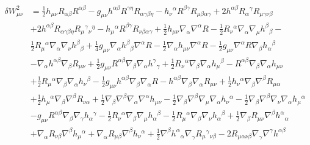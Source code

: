 \documentclass[10pt,letterpaper]{article}
\begin{document}
\begin{align*}
\delta W^2_{\mu\nu} &= \tfrac{1}{2} h_{\mu \nu} R_{\alpha \beta} R^{\alpha \beta} -  g_{\mu \nu} h^{\alpha \beta} R^{\gamma \eta} R_{\alpha \gamma \beta \eta} -  h_{\nu}{}^{\alpha} R^{\beta \gamma} R_{\mu \beta \alpha \gamma} + 2 h^{\alpha \beta} R_{\alpha}{}^{\gamma} R_{\mu \gamma \nu \beta} \\
&+ 2 h^{\alpha \beta} R_{\alpha \gamma \beta \eta} R_{\mu}{}^{\gamma}{}_{\nu}{}^{\eta} -  h_{\mu}{}^{\alpha} R^{\beta \gamma} R_{\nu \beta \alpha \gamma} + \tfrac{1}{2} h_{\mu \nu} \nabla_{\alpha}\nabla^{\alpha}R -  \tfrac{1}{2} R_{\nu}{}^{\alpha} \nabla_{\alpha}\nabla_{\mu}h^{\beta}{}_{\beta} -  \\
&\tfrac{1}{2} R_{\mu}{}^{\alpha} \nabla_{\alpha}\nabla_{\nu}h^{\beta}{}_{\beta} + \tfrac{1}{4} g_{\mu \nu} \nabla_{\alpha}h^{\beta}{}_{\beta} \nabla^{\alpha}R -  \tfrac{1}{2} \nabla_{\alpha}h_{\mu \nu} \nabla^{\alpha}R -  \tfrac{1}{2} g_{\mu \nu} \nabla^{\alpha}R \nabla_{\beta}h_{\alpha}{}^{\beta} \\
&-  \nabla_{\alpha}h^{\alpha \beta} \nabla_{\beta}R_{\mu \nu} + \tfrac{1}{2} g_{\mu \nu} R^{\alpha \beta} \nabla_{\beta}\nabla_{\alpha}h^{\gamma}{}_{\gamma} + \tfrac{1}{2} R_{\nu}{}^{\alpha} \nabla_{\beta}\nabla_{\alpha}h_{\mu}{}^{\beta} -  R^{\alpha \beta} \nabla_{\beta}\nabla_{\alpha}h_{\mu \nu} \\
&+ \tfrac{1}{2} R_{\mu}{}^{\alpha} \nabla_{\beta}\nabla_{\alpha}h_{\nu}{}^{\beta} -  \tfrac{1}{2} g_{\mu \nu} h^{\alpha \beta} \nabla_{\beta}\nabla_{\alpha}R -  h^{\alpha \beta} \nabla_{\beta}\nabla_{\alpha}R_{\mu \nu} + \tfrac{1}{2} h_{\nu}{}^{\alpha} \nabla_{\beta}\nabla^{\beta}R_{\mu \alpha} \\
&+ \tfrac{1}{2} h_{\mu}{}^{\alpha} \nabla_{\beta}\nabla^{\beta}R_{\nu \alpha} + \tfrac{1}{2} \nabla_{\beta}\nabla^{\beta}\nabla_{\alpha}\nabla^{\alpha}h_{\mu \nu} -  \tfrac{1}{2} \nabla_{\beta}\nabla^{\beta}\nabla_{\mu}\nabla_{\alpha}h_{\nu}{}^{\alpha} -  \tfrac{1}{2} \nabla_{\beta}\nabla^{\beta}\nabla_{\nu}\nabla_{\alpha}h_{\mu}{}^{\alpha}\\
& -  g_{\mu \nu} R^{\alpha \beta} \nabla_{\beta}\nabla_{\gamma}h_{\alpha}{}^{\gamma} -  \tfrac{1}{2} R_{\nu}{}^{\alpha} \nabla_{\beta}\nabla_{\mu}h_{\alpha}{}^{\beta} -  \tfrac{1}{2} R_{\mu}{}^{\alpha} \nabla_{\beta}\nabla_{\nu}h_{\alpha}{}^{\beta} + \tfrac{1}{2} \nabla_{\beta}R_{\mu \nu} \nabla^{\beta}h^{\alpha}{}_{\alpha}\\
& + \nabla_{\alpha}R_{\nu \beta} \nabla^{\beta}h_{\mu}{}^{\alpha} + \nabla_{\alpha}R_{\mu \beta} \nabla^{\beta}h_{\nu}{}^{\alpha} + \tfrac{1}{2} \nabla^{\beta}h^{\alpha}{}_{\alpha} \nabla_{\gamma}R_{\mu}{}^{\gamma}{}_{\nu \beta} - 2 R_{\mu \alpha \nu \beta} \nabla_{\gamma}\nabla^{\gamma}h^{\alpha \beta}\\

\end{align*}
\end{document}
